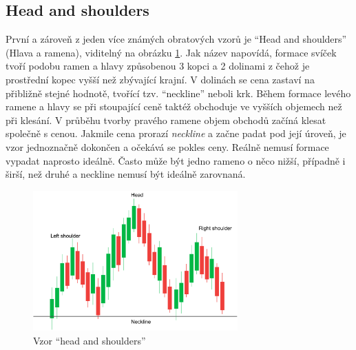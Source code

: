 \subsection{Head and shoulders}
První a zároveň z jeden více známých obratových vzorů je \enquote{Head and shoulders} (Hlava a ramena), viditelný na obrázku \ref{fig:head-n-shoulders}. Jak název napovídá, formace svíček tvoří podobu ramen a hlavy způsobenou
3 kopci a 2 dolinami z čehož je prostřední kopec vyšší než zbývající krajní. V dolinách se cena zastaví na přibližně stejné hodnotě, tvořící tzv. \enquote{neckline} neboli krk.
Během formace levého ramene a hlavy se při stoupající ceně taktéž obchoduje ve vyšších objemech než při klesání. V průběhu tvorby pravého ramene objem obchodů začíná klesat společně s cenou.
Jakmile cena prorazí \emph{neckline} a začne padat pod její úroveň, je vzor jednoznačně dokončen a očekává se pokles ceny. Reálně nemusí formace vypadat naprosto ideálně. Často
může být jedno rameno o něco nižší, případně i širší, než druhé a neckline nemusí být ideálně zarovnaná.

\begin{figure}[ht]
    \centering
    \includegraphics[width=0.7\textwidth]{Figures/Head-n-shoulders.pdf}
    \caption{Vzor \enquote{head and shoulders}}
    \label{fig:head-n-shoulders}
\end{figure}


